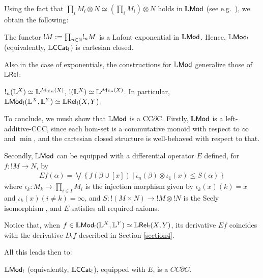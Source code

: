 Using the fact that $\prod_{i}M_{i}\otimes  N\simeq (\prod_{i}M_{i})\otimes N$ holds in $\mathbb{L}\mathsf{Mod}$ (see e.g.~\cite{Russo2007}), we obtain the following:
\begin{theorem}
The functor $!M:= \prod_{n\in \mathbb{N}}!_{n}M$ is a Lafont exponential in $\mathbb{L}\mathsf{Mod}$.
Hence, $\mathbb{L}\mathsf{Mod}_{!}$ (equivalently, $\mathbb{L}\mathsf{CCat}_{!}$) is cartesian closed. 
\end{theorem}

Also in the case of exponentials, the constructions for $\mathbb{L}\mathsf{Mod}$ generalize those of $\mathbb{L} \mathsf{Rel}$:
\begin{proposition}
$!_{n}(\mathbb{L}^{X})\simeq \mathbb{L}^{\mathcal{M}_{\leq n}(X)}$, $!(\mathbb{L}^{X})\simeq \mathbb{L}^{\mathcal{M}_{\mathrm{fin}}(X)}$. In particular, $\mathbb{L}\mathsf{Mod}_{!}(\mathbb{L}^{X},\mathbb{L}^{Y})\simeq \mathbb{L} \mathsf{Rel}_{!}(X,Y)$.
\end{proposition}

To conclude, we mush show that $\mathbb{L}\mathsf{Mod}$ is a CC$\partial$C.
Firstly, $\mathbb{L}\mathsf{Mod}$ is a left-additive-CCC, since each hom-set is a commutative monoid with respect to $\infty$ and $\min$, and the cartesian closed structure is well-behaved with respect to that.

Secondly, $\mathbb{L}\mathsf{Mod}$ can be equipped with a differential operator $E$ defined, for $f:!M\to N$, by 
\begin{align}\label{eq:dermod}
Ef(\alpha)=
\bigvee\left\{
f(\beta\cup [x]) \ \Big \vert  \ 
\iota_{n}(\beta)\otimes \iota_{1}(x) \leq S(\alpha)
\right\}
\end{align}
where $\iota_{k}: M_{k}\to \prod_{i\in I}M_{i}$ is the injection morphism given by $\iota_{k}(x)( k)=x$ and $\iota_{k}(x)(i\neq k)=\infty$,
and $S: !(M\times N)\to !M\otimes !N$ is the Seely isomorphism \cite{Mellies2018}, and $E$ satisfies all required axioms.

Notice that, when $f\in \mathbb{L}\mathsf{Mod}_{!}(\mathbb{L}^{X},\mathbb{L}^{Y})\simeq \mathbb{L} \mathsf{Rel}_{!}(X,Y)$, its derivative $E f$ coincides with the derivative $D_{!}f$ described in Section \ref{section4}. 

All this leads then to:
\begin{theorem}
$\mathbb{L}\mathsf{Mod}_{!}$ (equivalently, $\mathbb{L}\mathsf{CCat}_{!}$), equipped with $E$, is a $CC\partial C$.
\end{theorem}





